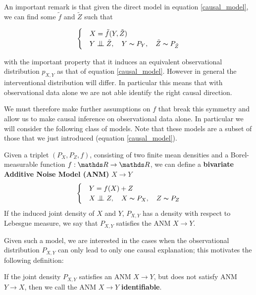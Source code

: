 An important remark is that given the direct model in equation \ref{causal_model}, we can find some 
$\tilde{f}$ and $\tilde{Z}$ such that

\begin{equation}
    \begin{cases} 
        & X = \tilde{f}(Y, \tilde{Z}) \\
        & Y \bigCI \tilde{Z},\quad Y \thicksim P_Y,\quad \tilde{Z} \thicksim P_{\tilde{Z}}  
     \end{cases}
\end{equation}

with the important property that it induces an equivalent observational distribution $p_{X, Y}$ as that of 
equation \ref{causal_model}. However in general the interventional distribution will differ. In particular 
this means that with observational data alone we are not able identify the right causal direction.

We must therefore make further assumptions on $f$ that break this symmetry and allow us to make causal inference
on observational data alone.
In particular we will consider the following class of models. Note that these models are a subset of those 
that we just introduced (equation \ref{causal_model}).

\begin{definition} Given a triplet $(P_X, P_Z, f)$, consisting of two finite mean densities and a Borel-measurable function
$f: \R \rightarrow \R$, we can define a \textbf{bivariate Additive Noise Model (ANM)} $X \rightarrow Y$
\[
    \begin{cases} 
        & Y = f(X) + Z \\
        & X \bigCI Z,\quad X \thicksim P_X,\quad Z \thicksim P_{Z}  
     \end{cases}  
\]
If the induced joint density of $X$ and $Y$, $P_{X, Y}$ has a density with respect to Lebesgue measure, 
we say that $P_{X, Y}$ satisfies the ANM $X \rightarrow Y$.
\end{definition}

Given such a model, we are interested in the cases when the observational distribution $P_{X, Y}$ can only
lead to only one causal explanation; this motivates the following definition:

\begin{definition} If the joint density $P_{X, Y}$ satisfies an ANM $X \rightarrow Y$, but does not satisfy
ANM $Y \rightarrow X$, then we call the ANM $X \rightarrow Y$ \textbf{identifiable}. 
\end{definition}

